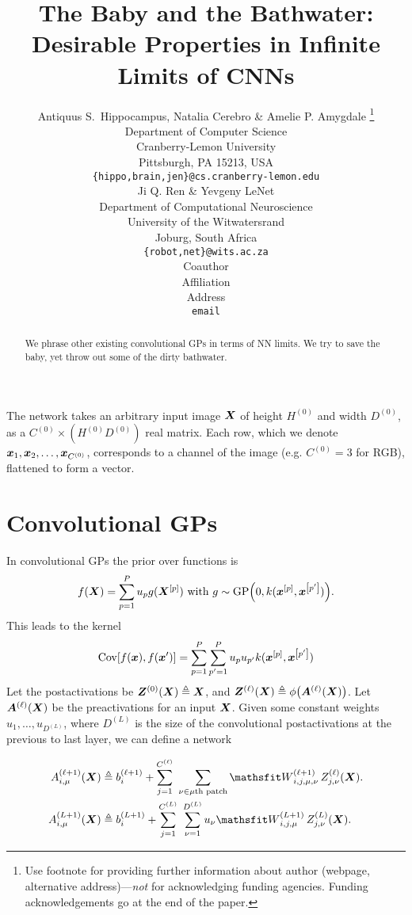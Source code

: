 \documentclass{article} %
\title{The Baby and the Bathwater: 
Desirable Properties in Infinite Limits of CNNs}
\author{Antiquus S.~Hippocampus, Natalia Cerebro \& Amelie P. Amygdale \thanks{ Use footnote for providing further information
about author (webpage, alternative address)---\emph{not} for acknowledging
funding agencies.  Funding acknowledgements go at the end of the paper.} \\
Department of Computer Science\\
Cranberry-Lemon University\\
Pittsburgh, PA 15213, USA \\
\texttt{\{hippo,brain,jen\}@cs.cranberry-lemon.edu} \\
\And
Ji Q. Ren \& Yevgeny LeNet \\
Department of Computational Neuroscience \\
University of the Witwatersrand \\
Joburg, South Africa \\
\texttt{\{robot,net\}@wits.ac.za} \\
\AND
Coauthor \\
Affiliation \\
Address \\
\texttt{email}
}
\newcommand{\bracket}[3]{{\left#1 #3 \right#2}}
\newcommand{\bra}{\bracket{(}{)}}
\newcommand{\sqb}{\bracket{[}{]}}
\newcommand{\ssup}[1]{^\bra{#1}}
\newcommand{\GP}[1]{{\text{GP}\bra{#1}}}
\newcommand{\eqdef}{\triangleq}
\newcommand{\patch}[1]{{{#1}\text{th patch}}}
\begin{document}
\maketitle

\begin{abstract}
  We phrase other existing convolutional GPs in terms of NN limits. We try to
  save the baby, yet throw out some of the dirty bathwater.
\end{abstract}

The network takes an arbitrary input image ${\bm{X}}$ of height $H\ssup{0}$ and
width $D\ssup{0}$, as a $C\ssup{0} \times (H\ssup{0}
D\ssup{0})$ real matrix. 
Each row, which we denote $\vx_1,\vx_2,\dotsc,\vx_{C\ssup{0}}$, corresponds to a channel
of the image (e.g. $C\ssup{0} = 3$ for RGB), flattened to form a 
vector.

\section{Convolutional GPs}

In convolutional GPs \citep{markvdw2017convolutional} the prior over functions is
\begin{equation}
  f(\mX) = \sum_{p=1}^P u_p g(\mX^\sqb{p}) \text{ with } g \sim \GP{0, k(\vx^\sqb{p}, \vx^\sqb{p'})}.
\end{equation}
This leads to the kernel 
\begin{equation}
\Cov\sqb{f(\vx), f(\vx')} = \sum_{p=1}^P\sum_{p'=1}^P u_p u_{p'} k(\vx^\sqb{p}, \vx^\sqb{p'})
\end{equation}
Let the postactivations be $\mZ\ssup{0}(\mX) \eqdef \mX$, and
$\mZ\ssup{\ell}(\mX) \eqdef \phi\bra{\mA\ssup{\ell}(\mX)}$. Let
$\mA\ssup{\ell}(\mX)$ be the preactivations for an input ${\bm{X}}$. Given some
constant weights ${u_1, \dots, u_{D\ssup{L}}}$, where $D\ssup{L}$ is the size of
the convolutional postactivations at the previous to last layer, we can define a
network

\begin{align}
  \emA_{i,\mu}\ssup{\ell+1}(\mX) &\eqdef \evb_i\ssup{\ell+1} +
  \sum_{j=1}^{C\ssup{\ell}} \ \sum_{\nu\in\patch{\mu}} \etW\ssup{\ell+1}_{i,j,\mu,\nu}\, \emZ\ssup{\ell}_{j,\nu}(\mX).
  \label{eq:convgp-network-recursive} \\
  \emA_{i,\mu}\ssup{L+1}(\mX) &\eqdef \evb_i\ssup{L+1} +
                                   \sum_{j=1}^{C\ssup{L}} \ \sum_{\nu=1}^{D\ssup{L}} u_\nu \etW\ssup{L+1}_{i,j,\mu}\, \emZ\ssup{L}_{j,\nu}(\mX).
                                   \label{eq:convgp-network-final}
\end{align}
\end{document}
